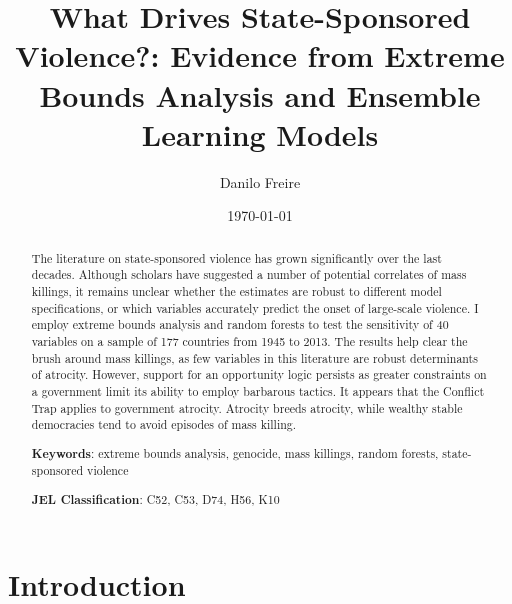 \documentclass[a4paper,12pt]{article}
\title{What Drives State-Sponsored Violence?: Evidence from Extreme Bounds Analysis and Ensemble Learning Models}
\author{Danilo Freire}
\date{\today}
\begin{document}
\maketitle
	
\begin{abstract}
 \noindent
The literature on state-sponsored violence has grown significantly over the last decades. Although scholars have suggested a number of potential correlates of mass killings, it remains unclear whether the estimates are robust to different model specifications, or which variables accurately predict the onset of large-scale violence. I employ extreme bounds analysis and random forests to test the sensitivity of 40 variables on a sample of 177 countries from 1945 to 2013. The results help clear the brush around mass killings, as few variables in this literature are robust determinants of atrocity. However, support for an opportunity logic persists as greater constraints on a government limit its ability to employ barbarous tactics. It appears that the Conflict Trap applies to government atrocity. Atrocity breeds atrocity, while wealthy stable democracies tend to avoid episodes of mass killing.
	
 \vspace{.75cm}
 \noindent
 \textbf{Keywords}: extreme bounds analysis, genocide, mass killings, random forests, state-sponsored violence
	
 \vspace{.25cm}
 \noindent
 \textbf{JEL Classification}: C52, C53, D74, H56, K10
\end{abstract}
	
\newpage
	
\section{Introduction}
\label{sec:intro}
	
\doublespacing
	
\end{document}
